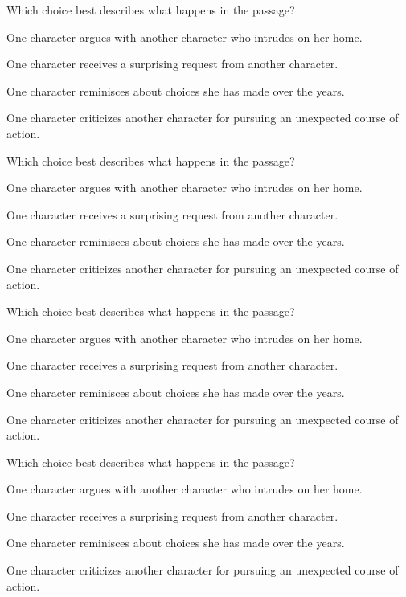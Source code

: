 \documentclass{article}
\begin{document}
\begin{enumext}[label=\arabic*,labelwidth=20pt,labelsep=0pt,columns=2,columns-sep=30pt,save-ans=stylesat, wrap-label={\stylesat{#1}}]
 \item Which choice best describes what happens in the passage?
   \begin{keyans}
    \item* One character argues with another character who intrudes on her home.
    \item One character receives a surprising request from another character.
    \item One character reminisces about choices she has made over the years.
    \item One character criticizes another character for pursuing an unexpected course of action.
   \end{keyans}

 \item Which choice best describes what happens in the passage?
   \begin{keyans}
    \item One character argues with another character who intrudes on her home.
    \item One character receives a surprising request from another character.
    \item* One character reminisces about choices she has made over the years.
    \item One character criticizes another character for pursuing an unexpected course of action.
   \end{keyans}

 \item Which choice best describes what happens in the passage?
   \begin{keyans}
    \item One character argues with another character who intrudes on her home.
    \item* One character receives a surprising request from another character.
    \item One character reminisces about choices she has made over the years.
    \item One character criticizes another character for pursuing an unexpected course of action.
   \end{keyans}

 \item Which choice best describes what happens in the passage?
   \begin{keyans}
    \item One character argues with another character who intrudes on her home.
    \item One character receives a surprising request from another character.
    \item One character reminisces about choices she has made over the years.
    \item* One character criticizes another character for pursuing an unexpected course of action.
   \end{keyans}
\end{enumext}

\end{document}
